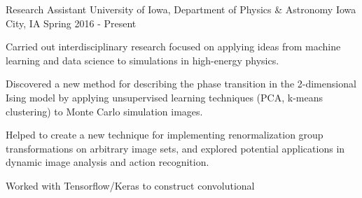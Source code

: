 \vspace{-1.75ex}


\begin{cventries}
  \cventry
  {Research Assistant} %
  {University of Iowa, Department of Physics \& Astronomy} %
  {Iowa City, IA} %
  {Spring 2016 - Present} %
  {
      \begin{cvitems} %
          \item {Carried out interdisciplinary research focused on applying
                  ideas from machine learning and data science to simulations in
                  high-energy physics.}
          \item {Discovered a new method for describing the phase transition in
                  the 2-dimensional Ising model by applying unsupervised
                  learning techniques (PCA, k-means clustering) to Monte Carlo
                  simulation images.}
          \item {Helped to create a new technique for implementing
                  renormalization group transformations on arbitrary image
                  sets, and explored potential applications in dynamic image
                  analysis and action recognition.}
          \item {Worked with Tensorflow/Keras to construct convolutional
}
\end{cvitems}}
\end{cventries}
